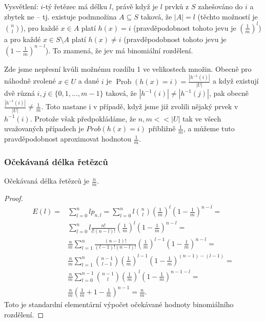 \documentclass[a4paper,12pt]{article}
\DeclareMathOperator*{\Prob}{Prob}
\begin{document}
Vysvětlení: $i$-tý řetězec má délku $
l$, právě když je $l$ prvků z $S$ zahešováno do $i$ a zbytek ne -- tj. existuje 
pod\-mno\-žina $A\subseteq S$ taková, že $|A|=l$ (těchto možností je 
$\binom nl$), pro každé $x\in A$ platí $h(x)=i$ (pravděpodobnost 
tohoto jevu je $(\frac 1m)^l$) a pro každé $x\in S\setminus 
A$ platí $h(x)\ne i$ 
(pravděpodobnost tohoto jevu je $(1-\frac 1m)^{n-l}$). To znamená, že jev má 
binomiální rozdělení.

Zde jsme nepřesní kvůli možnému rozdílu 1 ve velikostech množin. Obecně pro náhodně zvolené $
x\in U$ 
a dané $i$ je $\Prob(h(x)=i)=\frac {|h^{-1}(i)|}{|U|}$ a když existují dvě různá 
$i,j\in \{0,1,\dots,m-1\}$ taková, že $|h^{-1}(i)|\ne |h^{-1}
(j)|$, pak obecně 
$\frac {|h^{-1}(i)|}{|U|}\ne\frac 1m$. Toto nastane i v případě, když jsme již zvolili nějaký 
prvek v $h^{-1}(i)$. Protože však předpokládáme, že $
n,m<<|U|$ tak 
ve všech uvažovaných případech je $Prob(h(x)=i)$ přibližně 
$\frac 1m$, a můžeme tuto pravděpodobnost aproximovat 
hodnotou $\frac 1m$.

\subsubsection{Očekávaná délka řetězců}

\begin{veta}
    Očekávaná délka řetězců je $\frac{n}{m}$.
\end{veta}

\begin{proof}

\begin{align*} E(l)=&\sum_{l=0}^nlp_{n,l}=\sum_{l=0}^nl\binom nl(\frac 
1m)^l(1-\frac 1m)^{n-l}=\\
&\sum_{l=0}^nl\frac {n!}{l!(n-l)!}(\frac 1m)^l(1-\frac 1m)^{n-l}=\\
&\frac nm\sum_{l=1}^n\frac {(n-1)!}{(l-1)!(n-l)!}(\frac 1m)^{l-1}
(1-\frac 1m)^{n-l}=\\
&\frac nm\sum_{l=1}^n\binom {n-1}{l-1}(\frac 1m)^{l-1}(1-\frac 1m
)^{(n-1)-(l-1)}=\\
&\frac nm\sum_{l=0}^{n-1}\binom {n-1}l(\frac 1m)^l(1-\frac 1m)^{n
-1-l}=\\
&\frac nm(\frac 1m+1-\frac 1m)^{n-1}=\frac nm.\end{align*}
Toto je standardní elementární výpočet 
očekávané hodnoty binomiálního rozdělení.  
\end{proof}
\end{document}
